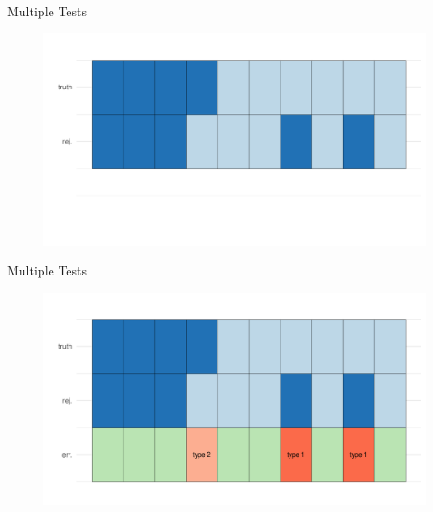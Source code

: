 \documentclass[xcolor={dvipsnames}]{beamer}
\begin{document}
\begin{frame}{Multiple Tests}
    \begin{figure}
        \centering
        \includegraphics[width = \textwidth]{Slides/MTP/plaatjes/mt2.pdf}
    \end{figure}
\end{frame}

\begin{frame}{Multiple Tests}
    \begin{figure}
        \centering
        \includegraphics[width = \textwidth]{Slides/MTP/plaatjes/mt3.pdf}

    \end{figure}

\end{frame}
\end{document}
